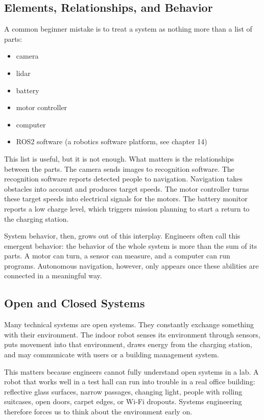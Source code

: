 \subsection{Elements, Relationships, and Behavior}
A common beginner mistake is to treat a system as nothing more than a list of parts:

\begin{itemize}
    \item camera
    \item lidar
    \item battery
    \item motor controller
    \item computer
    \item ROS2 software (a robotics software platform, see chapter 14)
\end{itemize}

This list is useful, but it is not enough. What matters is the relationships between the parts. The camera sends images to recognition software. The recognition software reports detected people to navigation. Navigation takes obstacles into account and produces target speeds. The motor controller turns these target speeds into electrical signals for the motors. The battery monitor reports a low charge level, which triggers mission planning to start a return to the charging station.

System behavior, then, grows out of this interplay. Engineers often call this emergent behavior: the behavior of the whole system is more than the sum of its parts. A motor can turn, a sensor can measure, and a computer can run programs. Autonomous navigation, however, only appears once these abilities are connected in a meaningful way.

\subsection{Open and Closed Systems}
Many technical systems are open systems. They constantly exchange something with their environment. The indoor robot senses its environment through sensors, puts movement into that environment, draws energy from the charging station, and may communicate with users or a building management system.

This matters because engineers cannot fully understand open systems in a lab. A robot that works well in a test hall can run into trouble in a real office building: reflective glass surfaces, narrow passages, changing light, people with rolling suitcases, open doors, carpet edges, or Wi-Fi dropouts. Systems engineering therefore forces us to think about the environment early on.

